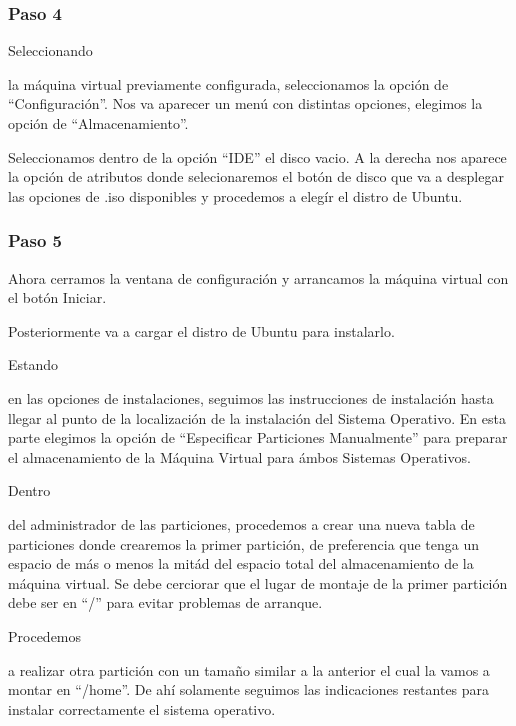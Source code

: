 \documentclass[stu, 12pt, letterpaper, donotrepeattitle, floatsintext, natbib]{apa7}
\begin{document}
    \subsubsection*{Paso 4}
    Seleccionando \begin{justifying}
      la máquina virtual previamente configurada, seleccionamos la opción de ``Configuración''. Nos va aparecer un menú con distintas opciones, elegimos la opción de ``Almacenamiento''.\par
    Seleccionamos dentro de la opción ``IDE'' el disco vacio. A la derecha nos aparece la opción de atributos donde selecionaremos el botón de disco que va a desplegar las opciones de .iso disponibles y procedemos
    a elegír el distro de Ubuntu.\par
    \end{justifying}
    \subsubsection*{Paso 5}
    Ahora cerramos la ventana de configuración y arrancamos la máquina virtual con el botón Iniciar.\par
    Posteriormente va a cargar el distro de Ubuntu para instalarlo.\par
    Estando \begin{justifying}
      en las opciones de instalaciones, seguimos las instrucciones de instalación hasta llegar al punto de la localización de la instalación del Sistema Operativo. En esta parte elegimos la opción de
    ``Especificar Particiones Manualmente'' para preparar el almacenamiento de la Máquina Virtual para ámbos Sistemas Operativos.\par
    \end{justifying}
    Dentro \begin{justifying}
      del administrador de las particiones, procedemos a crear una nueva tabla de particiones donde crearemos la primer partición, de preferencia que tenga un espacio de más o menos la mitád del espacio total del 
    almacenamiento de la máquina virtual. Se debe cerciorar que el lugar de montaje de la primer partición debe ser en ``/'' para evitar problemas de arranque.\par
    \end{justifying}
    Procedemos \begin{justifying}
      a realizar otra partición con un tamaño similar a la anterior el cual la vamos a montar en ``/home''. De ahí solamente seguimos las indicaciones restantes para instalar correctamente el sistema operativo.\par
    \end{justifying}
\end{document}
